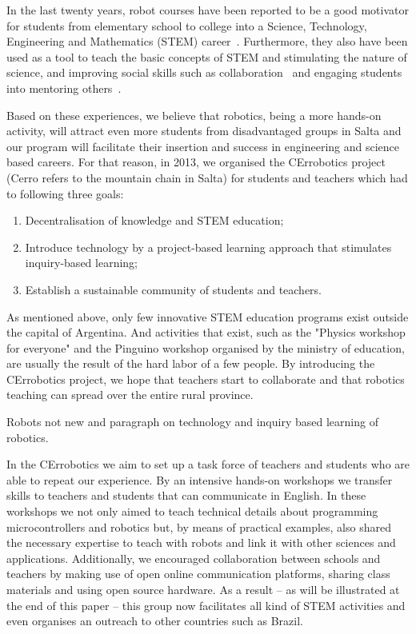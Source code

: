 \documentclass[a4paper]{llncs}
\begin{document}
In the last twenty years, robot courses have been reported to be a good motivator for students from elementary school to college into a Science, Technology, Engineering and Mathematics (STEM) career~\cite{RuizDelSolar2004,R ogers2004, Barak2009, wyffels2010, Nugent2010, wyffels2011, VanDyne2012, Karp2013}.
Furthermore, they also have been used as a tool to teach the basic concepts of STEM and stimulating the nature of science\cite{Rogers2004,Barak2009,wyffels2010,Nugent2010,wyffels2011,Carbajal2011,VanDyne2012,Karp2013}, and improving social skills such as collaboration~\cite{Barak2009,Nugent2010,wyffels2010,wyffels2011} and engaging students into mentoring others~\cite{Karp2013}.

Based on these experiences, we believe that robotics, being a more hands-on activity, will attract even more students from disadvantaged groups in Salta and our program will facilitate their insertion and success in engineering and science based careers.
For that reason, in 2013, we organised the CErrobotics project (Cerro refers to the mountain chain in Salta) for students and teachers which had to following three goals:
\begin{enumerate}
	\item Decentralisation of knowledge and STEM education;
	\item Introduce technology by a project-based learning approach that stimulates inquiry-based learning;
	\item Establish a sustainable community of students and teachers.
\end{enumerate}

As mentioned above, only few innovative STEM education programs exist outside the capital of Argentina.
And activities that exist, such as the "Physics workshop for everyone" and the Pinguino workshop organised by the ministry of education, are usually the result of the hard labor of a few people.
By introducing the CErrobotics project, we hope that teachers start to collaborate and that robotics teaching can spread over the entire rural province.

Robots not new and paragraph on technology and inquiry based learning of robotics.

In the CErrobotics we aim to set up a task force of teachers and students who are able to repeat our experience.
By an intensive hands-on workshops we transfer skills to teachers and students that can communicate in English.
In these workshops we not only aimed to teach technical details about programming microcontrollers and robotics but, by means of practical examples, also shared the necessary expertise to teach with robots and link it with other sciences and applications.
Additionally, we encouraged collaboration between schools and teachers by making use of open online communication platforms, sharing class materials and using open source hardware.
As a result -- as will be illustrated at the end of this paper --  this group now facilitates all kind of STEM activities and even organises an outreach to other countries such as Brazil.
\end{document}
